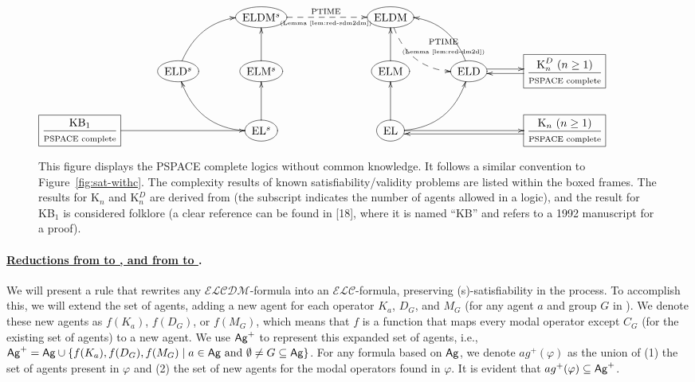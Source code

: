 \documentclass{article}
\newcommand{\ag}{\text{\normalfont\textsf{Ag}}\xspace}
\renewcommand{\phi}{\varphi}
\newcommand{\langc}{\ensuremath{\mathcal{ELC}}\xspace}
\newcommand{\langcdm}{\ensuremath{\mathcal{ELCDM}}\xspace}
\renewcommand{\l}{\text{\normalfont EL}\xspace}
\newcommand{\lc}{\text{\normalfont ELC}\xspace}
\newcommand{\ld}{\text{\normalfont ELD}\xspace}
\newcommand{\lm}{\text{\normalfont ELM}\xspace}
\newcommand{\ldm}{\text{\normalfont ELDM}\xspace}
\newcommand{\lcdm}{\text{\normalfont ELCDM}\xspace}
\newcommand{\ls}{\text{\normalfont EL$^s$}\xspace}
\newcommand{\lsc}{\text{\normalfont ELC$^s$}\xspace}
\newcommand{\lsd}{\text{\normalfont ELD$^s$}\xspace}
\newcommand{\lsm}{\text{\normalfont ELM$^s$}\xspace}
\newcommand{\lsdm}{\text{\normalfont ELDM$^s$}\xspace}
\newcommand{\lscdm}{\text{\normalfont ELCDM$^s$}\xspace}
\begin{document}
\begin{figure}
\footnotesize
\centering
$\xymatrix@C=3.3em{
&&*++o[F]{\lsdm}\ar@{-->}[rr]^{\text{PTIME}}_{\text{\tiny(Lemma~\ref{lem:red-sdm2dm})}}
&&*++o[F]{\ldm}\ar@/_1.5pc/@{-->}[dr]^{\text{\hspace{-6pt}\begin{tabular}{@{}c@{}}
PTIME\\[-1.2ex]\tiny(Lemma~\ref{lem:red-dm2d})
\end{tabular}}}
\\
&*++o[F]{\lsd}\ar@/^1.5pc/[ur]
&*++o[F]{\lsm}\ar[u]
&&*++o[F]{\lm}\ar[u]
&*++o[F]{\ld}\ar@/_1.5pc/[ul]\ar@<2pt>[r]
&*+[F]{\dfrac{\textrm{K}^D_n\ (n \geq 1)}{\text{\scriptsize PSPACE complete}}}\ar@<2pt>[l]
\\
*+[F]{\dfrac{\textrm{KB}_1}{\text{\scriptsize PSPACE complete}}}\ar[rr]
&&*++o[F]{\ls}\ar@/^1.6pc/[lu]\ar[u]
&& *++o[F]{\l}\ar@<0pt>[rr]\ar[u]\ar@/_1.5pc/[ur]
&& *+[F]{\dfrac{\textrm{K}_n\ (n \geq 1)}{\text{\scriptsize PSPACE complete}}}\ar@<3pt>[ll]
}$
\caption{This figure displays the PSPACE complete logics without common knowledge. It follows a similar convention to Figure~\ref{fig:sat-withc}. The complexity results of known satisfiability/validity problems are listed within the boxed frames. The results for \textrm{K}$_n$ and \textrm{K}$_n^D$ are derived from \cite[Section 3.5]{FHMV1995} (the subscript indicates the number of agents allowed in a logic), and the result for \textrm{KB}$_1$ is considered folklore (a clear reference can be found in [18], where it is named ``KB'' and refers to a 1992 manuscript for a proof).}\label{fig:sat-nonc}
\end{figure}


\paragraph{\bfseries\underline{Reductions from \lcdm to \lc, and from \lscdm to \lsc}.}

We will present a rule that rewrites any \langcdm-formula into an \langc-formula, preserving (s)-satisfiability in the process. To accomplish this, we will extend the set \ag of agents, adding a new agent for each operator $K_a$, $D_G$, and $M_G$ (for any agent $a$ and group $G$ in \ag). We denote these new agents as $f(K_a)$, $f(D_G)$, or $f(M_G)$, which means that $f$ is a function that maps every modal operator except $C_G$ (for the existing set \ag of agents) to a new agent. We use $\ag^+$ to represent this expanded set of agents, i.e., $\ag^+ = \ag \cup \{f(K_a), f(D_G), f(M_G) \mid a \in \ag \text{ and } \emptyset \neq G \subseteq \ag\}$. For any formula based on $\ag$, we denote $ag^+ (\phi)$ as the union of (1) the set of agents present in $\phi$ and (2) the set of new agents for the modal operators found in $\phi$. It is evident that $ag^+(\phi) \subseteq \ag^+$. 
\end{document}
